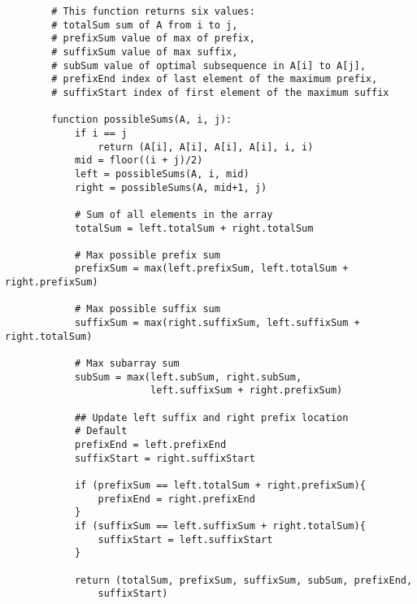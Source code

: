 \documentclass[12pt]{article}
\begin{document}
\begin{enumerate}
    \begin{verbatim}
        # This function returns six values: 
        # totalSum sum of A from i to j, 
        # prefixSum value of max of prefix, 
        # suffixSum value of max suffix, 
        # subSum value of optimal subsequence in A[i] to A[j], 
        # prefixEnd index of last element of the maximum prefix, 
        # suffixStart index of first element of the maximum suffix
        
        function possibleSums(A, i, j):
            if i == j
                return (A[i], A[i], A[i], A[i], i, i)
            mid = floor((i + j)/2)
            left = possibleSums(A, i, mid)
            right = possibleSums(A, mid+1, j)

            # Sum of all elements in the array
            totalSum = left.totalSum + right.totalSum

            # Max possible prefix sum
            prefixSum = max(left.prefixSum, left.totalSum + right.prefixSum)

            # Max possible suffix sum
            suffixSum = max(right.suffixSum, left.suffixSum + right.totalSum)

            # Max subarray sum
            subSum = max(left.subSum, right.subSum, 
                         left.suffixSum + right.prefixSum) 

            ## Update left suffix and right prefix location
            # Default
            prefixEnd = left.prefixEnd
            suffixStart = right.suffixStart

            if (prefixSum == left.totalSum + right.prefixSum){
                prefixEnd = right.prefixEnd
            }
            if (suffixSum == left.suffixSum + right.totalSum){
                suffixStart = left.suffixStart
            }

            return (totalSum, prefixSum, suffixSum, subSum, prefixEnd, 
                suffixStart)
    \end{verbatim}

\end{enumerate}
\end{document}
